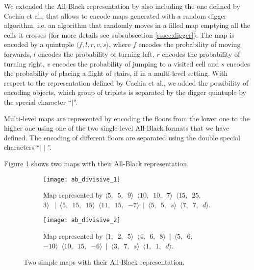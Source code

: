 \par

We extended the All-Black representation by also including the one defined by Cachia et al.\cite{MultiLevelEvolution}, that allows to encode maps generated with a random digger algorithm, i.e. an algorithm that randomly moves in a filled map emptying all the cells it crosses (for more details see subsubsection \ref{sssec:digger}). The map is encoded by a quintuple $\langle f,l,r,v,s \rangle$, where $f$ encodes the probability of moving forwards, $l$ encodes the probability of turning left, $r$ encodes the probability of turning right, $v$ encodes the probability of jumping to a visited cell and $s$ encodes the probability of placing a flight of stairs, if in a multi-level setting. With respect to the representation defined by Cachia et al., we added the possibility of encoding objects, which group of triplets is separated by the digger quintuple by the special character ``$\mid$''.

\par

Multi-level maps are represented by encoding the floors from the lower one to the higher one using one of the two single-level All-Black formats that we have defined. The encoding of different floors are separated using the double special characters ``$\mid\mid$''.

\par

Figure \ref{fig:allblack} shows two maps with their All-Black representation.

\begin{figure}[tp]
	\centering
	\hfill
  	\begin{subfigure}[t]{0.45\linewidth}
		\texttt{[image: ab\_divisive\_1]}
     		\caption{Map represented by $\langle 5, $\ $ 5, $\ $ 9 \rangle $\ $ \langle 10, $\ $ 10, $\ $ 7 \rangle $\ $  \langle 15, $\ $ 25, $\ $ 3 \rangle\ $\ $ \mid $\ $  \langle 5, $\ $ 15, $\ $ 15 \rangle $\ $  \langle 11, $\ $ 15, $\ $ -7 \rangle $\ $  \mid $\ $  \langle 5, $\ $ 5, $\ $ s \rangle $\ $  \langle 7, $\ $ 7, $\ $ d \rangle$.}
 	\end{subfigure}
 	\hfill
  	\begin{subfigure}[t]{0.45\linewidth}
    		\texttt{[image: ab\_divisive\_2]}
     		\caption{Map represented by $\langle 1,$\ $2, $\ $5  \rangle $\ $\langle4,$\ $6,$\ $8\rangle $\ $ \mid $\ $ \langle5,$\ $6,$\ $-10\rangle $\ $ \langle10,$\ $15,$\ $-6\rangle $\ $ \mid $\ $ \langle3, $\ $7, $\ $s\rangle $\ $ \langle1, $\ $1, $\ $d\rangle$.}
  	\end{subfigure}
  	\hfill
\caption{Two simple maps with their All-Black representation.}
\label{fig:allblack}
\end{figure}

